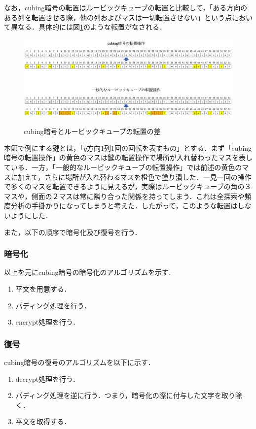 \documentclass[a4j,titlepage]{jsarticle}
\begin{document}
なお，cubing暗号の転置はルービックキューブの転置と比較して，「ある方向のある列を転置させる際，他の列およびマスは一切転置させない」という点において異なる．具体的には図\ref{fig:trans-diff}のような転置がなされる．
\begin{figure}[htb]
  \centering
  \includegraphics[width=12cm]{./tex_pic/trans.png}\\
  \caption{cubing暗号とルービックキューブの転置の差}
  \label{fig:trans-diff}
\end{figure}
本節で例にする鍵とは，「\(y\)方向1列1回の回転を表すもの」とする．まず「cubing暗号の転置操作」の黄色のマスは鍵の転置操作で場所が入れ替わったマスを表している．一方，「一般的なルービックキューブの転置操作」では前述の黄色のマスに加えて，さらに場所が入れ替わるマスを橙色で塗り潰した．一見一回の操作で多くのマスを転置できるように見えるが，実際はルービックキューブの角の３マスや，側面の２マスは常に隣り合った関係を持ってしまう．これは全探索や頻度分析の手掛かりになってしまうと考えた．したがって，このような転置はしないようにした．

また，以下の順序で暗号化及び復号を行う．
\subsubsection{暗号化}
以上を元にcubing暗号の暗号化のアルゴリズムを示す. 
\begin{screen}
  \begin{enumerate}
    \item 平文を用意する．
    \item パディング処理を行う．
    \item encrypt処理を行う．
  \end{enumerate}
\end{screen}

\subsubsection{復号}
cubing暗号の復号のアルゴリズムを以下に示す．
\begin{screen}
  \begin{enumerate}
    \item decrypt処理を行う．
    \item パディング処理を逆に行う．つまり，暗号化の際に付与した文字を取り除く．
    \item 平文を取得する．
  \end{enumerate}
\end{screen}
\end{document}
